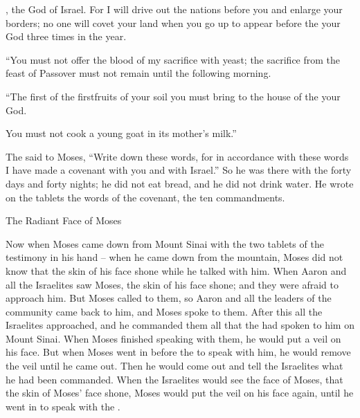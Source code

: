 {{}, the God
of Israel.
For
I will drive
out the nations
before
you and enlarge
your borders;
no
one will covet
your land
when you go up
to appear
before
the {}
your God
three
times
in the year.
\par }{\PP {}“You must not
offer
the blood
of my sacrifice
with yeast;
the sacrifice
from the feast
of Passover
must not
remain
until the following morning.
\par }{\PP {}“The first
of the firstfruits
of your soil
you must bring
to the house
of the {}
your God.
\par }{\PP You must not
cook
a young goat
in its mother’s
milk.”
\par }{\PP {}The
{}
said
to
Moses,
“Write
down these
words,
for
in accordance
with these
words
I
have made
a covenant
with
you and with
Israel.”
So he was there
with
the {}
forty
days
and forty
nights;
he did not
eat
bread,
and he did not
drink
water.
He wrote
on
the tablets
the
words
of the covenant,
the ten
commandments.
\par }{\SH The Radiant Face of Moses
\par }{\PP {}Now when
Moses
came down
from Mount
Sinai
with the two
tablets
of the testimony
in his
hand –
when he came down
from
the mountain,
Moses
did not
know
that
the skin
of his face
shone
while he talked
with him.
When
Aaron
and all
the Israelites
saw
Moses,
the skin
of his face
shone;
and they were afraid
to approach
him.
But Moses
called
to
them, so
Aaron
and all
the leaders
of the community
came
back
to him,
and Moses
spoke
to them.
After
this
all
the Israelites
approached,
and he commanded
them all
that
the {}
had
spoken
to him
on Mount
Sinai.
When Moses
finished
speaking
with
them, he would put
a veil
on his face.
But when
Moses
went
in before
the {}
to speak
with
him, he would remove
the veil
until
he came out.
Then he would come out
and tell
the Israelites
what
he had
been commanded.
When
the Israelites
would see the
face
of Moses,
that
the skin
of Moses’
face
shone,
Moses
would put the veil
on
his face
again,
until
he went
in to speak
with the
{}.


}
